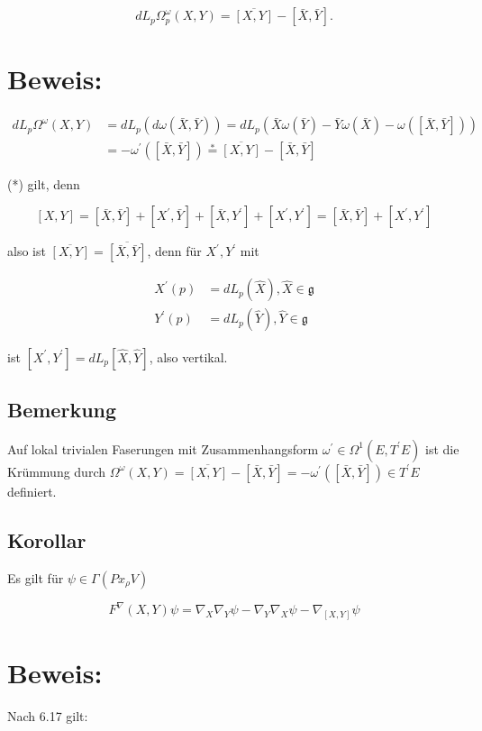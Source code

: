 \documentclass[10pt, letterpaper]{article}
\begin{document}
$$
d L_{p} \Omega_{p}^{\omega}(X, Y)=\overline{[X, Y]}-[\bar{X}, \bar{Y}] .
$$

\section*{Beweis:}
$$
\begin{aligned}
d L_{p} \Omega^{\omega}(X, Y) & =d L_{p}(d \omega(\bar{X}, \bar{Y}))=d L_{p}(\bar{X} \omega(\bar{Y})-\bar{Y} \omega(\bar{X})-\omega([\bar{X}, \bar{Y}])) \\
& =-\omega^{\prime}([\bar{X}, \bar{Y}]) \stackrel{*}{=} \overline{[X, Y]}-[\bar{X}, \bar{Y}]
\end{aligned}
$$

(*) gilt, denn

$$
[X, Y]=[\bar{X}, \bar{Y}]+\left[X^{\prime}, \bar{Y}\right]+\left[\bar{X}, Y^{\prime}\right]+\left[X^{\prime}, Y^{\prime}\right]=[\bar{X}, \bar{Y}]+\left[X^{\prime}, Y^{\prime}\right]
$$

also ist $\overline{[X, Y]}=\overline{[\bar{X}, \bar{Y}]}$, denn für $X^{\prime}, Y^{\prime}$ mit

$$
\begin{aligned}
X^{\prime}(p) & =d L_{p}(\hat{X}), \hat{X} \in \mathfrak{g} \\
Y^{\prime}(p) & =d L_{p}(\hat{Y}), \hat{Y} \in \mathfrak{g}
\end{aligned}
$$

ist $\left[X^{\prime}, Y^{\prime}\right]=d L_{p}[\hat{X}, \hat{Y}]$, also vertikal.

\subsection*{Bemerkung}
Auf lokal trivialen Faserungen mit Zusammenhangsform $\omega^{\prime} \in \Omega^{1}\left(E, T^{\prime} E\right)$ ist die Krümmung durch $\Omega^{\omega}(X, Y)=\overline{[X, Y]}-[\bar{X}, \bar{Y}]=-\omega^{\prime}([\bar{X}, \bar{Y}]) \in T^{\prime} E$ definiert.

\subsection*{Korollar}
Es gilt für $\psi \in \Gamma\left(P x_{\rho} V\right)$

$$
F^{\nabla}(X, Y) \psi=\nabla_{X} \nabla_{Y} \psi-\nabla_{Y} \nabla_{X} \psi-\nabla_{[X, Y]} \psi
$$

\section*{Beweis:}
Nach 6.17 gilt:
\end{document}
